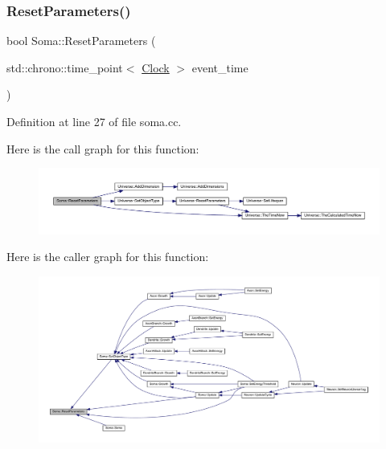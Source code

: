 \subsubsection{\texorpdfstring{Reset\+Parameters()}{ResetParameters()}}
{\footnotesize\ttfamily bool Soma\+::\+Reset\+Parameters (\begin{DoxyParamCaption}\item[{std\+::chrono\+::time\+\_\+point$<$ \hyperlink{universe_8h_a0ef8d951d1ca5ab3cfaf7ab4c7a6fd80}{Clock} $>$}]{event\+\_\+time }\end{DoxyParamCaption})}



Definition at line 27 of file soma.\+cc.

Here is the call graph for this function\+:
\nopagebreak
\begin{figure}[H]
\begin{center}
\leavevmode
\includegraphics[width=350pt]{class_soma_a82f016dc126f7d1053e5eb455d28c44b_cgraph}
\end{center}
\end{figure}
Here is the caller graph for this function\+:
\nopagebreak
\begin{figure}[H]
\begin{center}
\leavevmode
\includegraphics[width=350pt]{class_soma_a82f016dc126f7d1053e5eb455d28c44b_icgraph}
\end{center}
\end{figure}
\mbox{\label{class_soma_a6ee53e0dd77fec097da1b81472d6f147}} 
